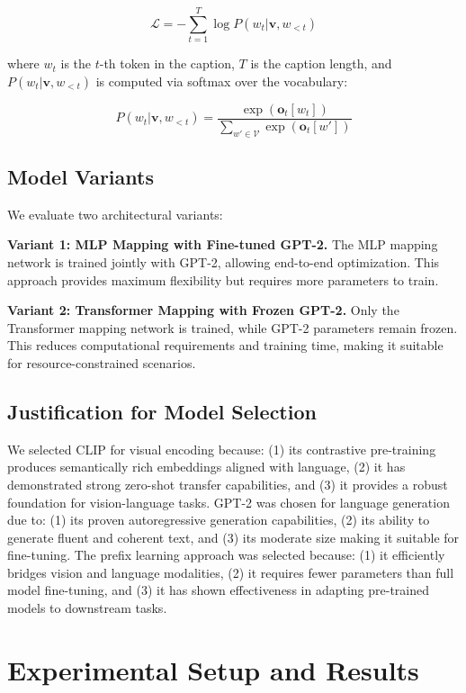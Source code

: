 \documentclass[runningheads]{llncs}
\begin{document}
\begin{equation}
\mathcal{L} = -\sum_{t=1}^{T} \log P(w_t | \mathbf{v}, w_{<t})
\end{equation}

where $w_t$ is the $t$-th token in the caption, $T$ is the caption length, and $P(w_t | \mathbf{v}, w_{<t})$ is computed via softmax over the vocabulary:

\begin{equation}
P(w_t | \mathbf{v}, w_{<t}) = \frac{\exp(\mathbf{o}_t[w_t])}{\sum_{w' \in \mathcal{V}} \exp(\mathbf{o}_t[w'])}
\end{equation}

\subsection{Model Variants}

We evaluate two architectural variants:

\textbf{Variant 1: MLP Mapping with Fine-tuned GPT-2.} The MLP mapping network is trained jointly with GPT-2, allowing end-to-end optimization. This approach provides maximum flexibility but requires more parameters to train.

\textbf{Variant 2: Transformer Mapping with Frozen GPT-2.} Only the Transformer mapping network is trained, while GPT-2 parameters remain frozen. This reduces computational requirements and training time, making it suitable for resource-constrained scenarios.

\subsection{Justification for Model Selection}

We selected CLIP for visual encoding because: (1) its contrastive pre-training produces semantically rich embeddings aligned with language, (2) it has demonstrated strong zero-shot transfer capabilities, and (3) it provides a robust foundation for vision-language tasks. GPT-2 was chosen for language generation due to: (1) its proven autoregressive generation capabilities, (2) its ability to generate fluent and coherent text, and (3) its moderate size making it suitable for fine-tuning. The prefix learning approach was selected because: (1) it efficiently bridges vision and language modalities, (2) it requires fewer parameters than full model fine-tuning, and (3) it has shown effectiveness in adapting pre-trained models to downstream tasks.

\section{Experimental Setup and Results}
\end{document}
